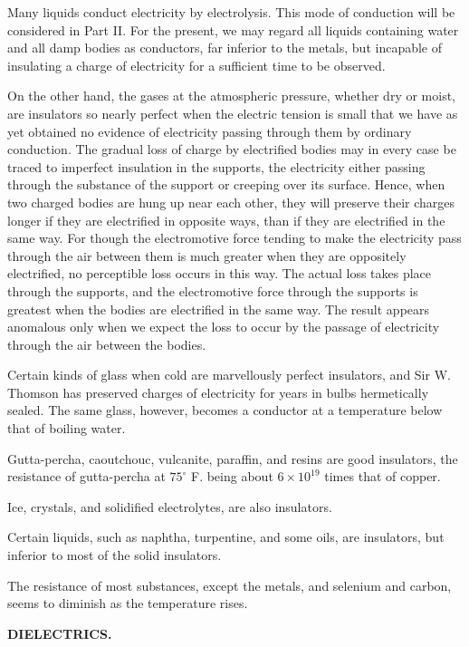 \documentclass[11pt,a4paper]{article}
\begin{document}
Many liquids conduct electricity by electrolysis. This mode of
conduction will be considered in Part II. For the present, we may regard
all liquids containing water and all damp bodies as conductors, far
inferior to the metals, but incapable of insulating a charge of
electricity for a sufficient time to be observed.

On the other hand, the gases at the atmospheric pressure, whether dry or
moist, are insulators so nearly perfect when the electric tension is
small that we have as yet obtained no evidence of electricity passing
through them by ordinary conduction. The gradual loss of charge by
electrified bodies may in every case be traced to imperfect insulation
in the supports, the electricity either passing through the substance of
the support or creeping over its surface. Hence, when two charged bodies
are hung up near each other, they will preserve their charges longer if
they are electrified in opposite ways, than if they are electrified in
the same way. For though the electromotive force tending to make the
electricity pass through the air between them is much greater when they
are oppositely electrified, no perceptible loss occurs in this way. The
actual loss takes place through the supports, and the electromotive
force through the supports is greatest when the bodies are electrified
in the same way. The result appears anomalous only when we expect the
loss to occur by the passage of electricity through the air between the
bodies.

Certain kinds of glass when cold are marvellously perfect insulators,
and Sir W. Thomson has preserved charges of electricity for years in
bulbs hermetically sealed. The same glass, however, becomes a conductor
at a temperature below that of boiling water.

Gutta-percha, caoutchouc, vulcanite, paraffin, and resins are good
insulators, the resistance of gutta-percha at \(75^\circ\) F. being
about \(6 \times 10^{19}\) times that of copper.

Ice, crystals, and solidified electrolytes, are also insulators.

\clearpage
\setcounter{footnote}{0}

Certain liquids, such as naphtha, turpentine, and some oils, are
insulators, but inferior to most of the solid insulators.

The resistance of most substances, except the metals, and selenium
and carbon, seems to diminish as the temperature rises.

\begin{center}
\textbf{DIELECTRICS.}
\end{center}
\end{document}
